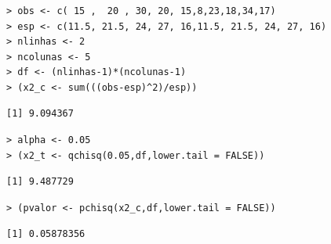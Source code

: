 \documentclass[14pt,aspectratio=1610]{beamer}
\begin{document}
\begin{frame}[fragile]{}
\frametitle{}
\begin{block}{}
\justifying
\begin{verbatim}
> obs <- c( 15 ,  20 , 30, 20, 15,8,23,18,34,17)
> esp <- c(11.5, 21.5, 24, 27, 16,11.5, 21.5, 24, 27, 16)
> nlinhas <- 2
> ncolunas <- 5
> df <- (nlinhas-1)*(ncolunas-1)
> (x2_c <- sum(((obs-esp)^2)/esp))
\end{verbatim}

\begin{verbatim}
[1] 9.094367
\end{verbatim}

\begin{verbatim}
> alpha <- 0.05
> (x2_t <- qchisq(0.05,df,lower.tail = FALSE))
\end{verbatim}

\begin{verbatim}
[1] 9.487729
\end{verbatim}

\begin{verbatim}
> (pvalor <- pchisq(x2_c,df,lower.tail = FALSE))
\end{verbatim}
\begin{verbatim}
[1] 0.05878356
\end{verbatim}
\end{block}
\end{frame}
\end{document}
